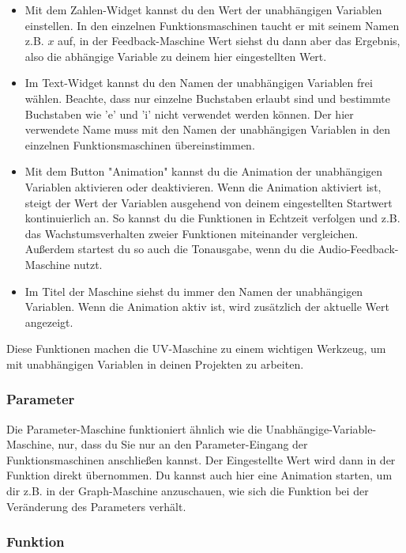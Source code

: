 \documentclass[12pt]{report}
\begin{document}
\begin{itemize}
    \item {} Mit dem Zahlen-Widget kannst du den Wert der unabhängigen Variablen einstellen. In den einzelnen Funktionsmaschinen taucht er mit seinem Namen z.B. $x$ auf, in der Feedback-Maschine Wert siehst du dann aber das Ergebnis, also die abhängige Variable zu deinem hier eingestellten Wert.
    
    \item {} Im Text-Widget kannst du den Namen der unabhängigen Variablen frei wählen. Beachte, dass nur einzelne Buchstaben erlaubt sind und bestimmte Buchstaben wie 'e' und 'i' nicht verwendet werden können. Der hier verwendete Name muss mit den Namen der unabhängigen Variablen in den einzelnen Funktionsmaschinen übereinstimmen.
    
    \item {} Mit dem Button "Animation" kannst du die Animation der unabhängigen Variablen aktivieren oder deaktivieren. Wenn die Animation aktiviert ist, steigt der Wert der Variablen ausgehend von deinem eingestellten Startwert kontinuierlich an. So kannst du die Funktionen in Echtzeit verfolgen und z.B. das Wachstumsverhalten zweier Funktionen miteinander vergleichen. Außerdem startest du so auch die Tonausgabe, wenn du die Audio-Feedback-Maschine nutzt.
    
    \item {} Im Titel der Maschine siehst du immer den Namen der unabhängigen Variablen. Wenn die Animation aktiv ist, wird zusätzlich der aktuelle Wert angezeigt.
\end{itemize}

Diese Funktionen machen die UV-Maschine zu einem wichtigen Werkzeug, um mit unabhängigen Variablen in deinen Projekten zu arbeiten.
\subsubsection{Parameter}
Die Parameter-Maschine funktioniert ähnlich wie die Unabhängige-Variable-Maschine, nur, dass du Sie nur an den Parameter-Eingang der Funktionsmaschinen anschließen kannst. Der Eingestellte Wert wird dann in der Funktion direkt übernommen. Du kannst auch hier eine Animation starten, um dir z.B. in der Graph-Maschine anzuschauen, wie sich die Funktion bei der Veränderung des Parameters verhält.
\subsubsection{Funktion}
\end{document}

